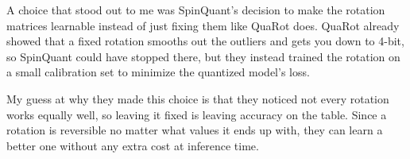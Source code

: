 \documentclass{article}
\begin{document}
\begin{probset}
\begin{prob}
    \begin{soln}
        A choice that stood out to me was SpinQuant's decision to make the rotation matrices learnable instead of just fixing them like QuaRot does. QuaRot already showed that a fixed rotation smooths out the outliers and gets you down to 4-bit, so SpinQuant could have stopped there, but they instead trained the rotation on a small calibration set to minimize the quantized model's loss.

        My guess at why they made this choice is that they noticed not every rotation works equally well, so leaving it fixed is leaving accuracy on the table. Since a rotation is reversible no matter what values it ends up with, they can learn a better one without any extra cost at inference time. 
    \end{soln}
\end{prob}
\end{probset}
\end{document}
